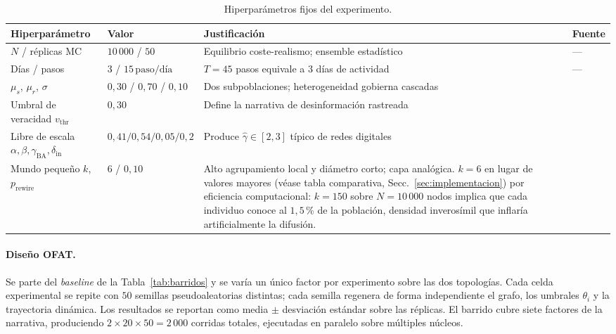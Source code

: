 \begin{table}[ht]
  \centering
  \small
  \caption{Hiperparámetros fijos del experimento.}
  \label{tab:fijos}
  \begin{tabular}{@{}p{3.4cm} p{2.4cm} p{5.2cm} l@{}}
    \toprule
    \textbf{Hiperparámetro} & \textbf{Valor} & \textbf{Justificación} & \textbf{Fuente} \\
    \midrule
    $N$ / réplicas MC & $10\,000$ / $50$ & Equilibrio coste-realismo; ensemble estadístico & --- \\
    \addlinespace
    Días / pasos & $3$ / $15\,\text{paso/día}$ & $T = 45$ pasos equivale a 3 días de actividad & --- \\
    \addlinespace
    $\mu_s$, $\mu_r$, $\sigma$ & $0{,}30$ / $0{,}70$ / $0{,}10$ & Dos subpoblaciones; heterogeneidad gobierna cascadas & \cite{Granovetter1978,Watts2002} \\
    \addlinespace
    Umbral de veracidad $v_{\text{thr}}$ & $0{,}30$ & Define la narrativa de desinformación rastreada & \cite{Vosoughi2018} \\
    \addlinespace
    Libre de escala $\alpha,\beta,\gamma_{\mathrm{BA}},\delta_{\mathrm{in}}$ & $0{,}41/0{,}54/0{,}05/0{,}2$ & Produce $\hat\gamma \in [2,3]$ típico de redes digitales & \cite{Bollobas2003} \\
    \addlinespace
    Mundo pequeño $k$, $p_{\mathrm{rewire}}$ & $6$ / $0{,}10$ & Alto agrupamiento local y diámetro corto; capa analógica. $k{=}6$ en lugar de valores mayores (véase tabla comparativa, Secc.~\ref{sec:implementacion}) por eficiencia computacional: $k{=}150$ sobre $N{=}10\,000$ nodos implica que cada individuo conoce al $1{,}5$\,\% de la población, densidad inverosímil que inflaría artificialmente la difusión. & \cite{WattsStrogatz1998,Dunbar1992} \\
    \bottomrule
  \end{tabular}
\end{table}

\paragraph{Diseño OFAT.}
Se parte del \emph{baseline} de la Tabla~\ref{tab:barridos} y se varía un único factor por experimento sobre las dos topologías. Cada celda experimental se repite con $50$ semillas pseudoaleatorias distintas; cada semilla regenera de forma independiente el grafo, los umbrales $\theta_i$ y la trayectoria dinámica. Los resultados se reportan como media $\pm$ desviación estándar sobre las réplicas. El barrido cubre siete factores de la narrativa, produciendo $2 \times 20 \times 50 = 2\,000$ corridas totales, ejecutadas en paralelo sobre múltiples núcleos.

